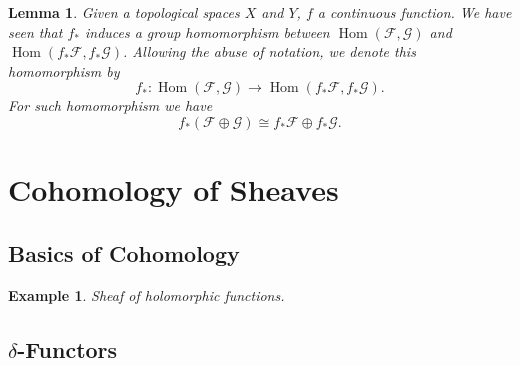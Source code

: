 \documentclass{article}
\newtheorem{lemma}{Lemma}[section]
\newtheorem{example}{Example}[section]
\numberwithin{equation}{section}
\DeclareMathOperator{\Hom}{Hom}
\begin{document}
\begin{lemma}
Given a topological spaces $X$ and $Y$, $f$ a continuous function. We have seen that $f_*$ induces a group homomorphism between $\Hom(\mathcal{F},\mathcal{G})$ and $\Hom(f_*\mathcal{F},f_*\mathcal{G})$. Allowing the abuse of notation, we denote this homomorphism by 
\begin{equation*}
f_*:\Hom(\mathcal{F},\mathcal{G})\to\Hom(f_*\mathcal{F},f_*\mathcal{G}).
\end{equation*}
For such homomorphism we have
\begin{equation*}
f_*(\mathcal{F}\oplus\mathcal{G}) \cong f_*\mathcal{F}\oplus f_*\mathcal{G}.
\end{equation*}
\end{lemma}

\section{Cohomology of Sheaves}

\subsection{Basics of Cohomology}


\begin{example}
Sheaf of holomorphic functions.
\end{example}

\subsection{$\delta$-Functors}
\end{document}
